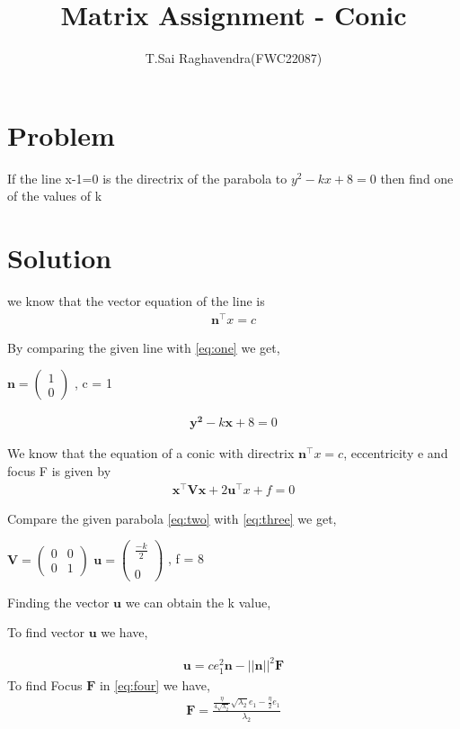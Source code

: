 \documentclass[journal,12pt,twocolumn]{IEEEtran}
\title{\mytitle}
\title{
Matrix Assignment - Conic
}
\author{T.Sai Raghavendra(FWC22087)}
\newcommand{\myvec}[1]{\ensuremath{\begin{pmatrix}#1\end{pmatrix}}}
\let\vec\mathbf
\begin{document}
\maketitle
\tableofcontents
\bigskip


\section{Problem}
If the line x-1=0 is the directrix of the parabola to $y^2-kx+8=0$ then find one of the values of k


\section{Solution}

we know that the vector equation of the line is 
\begin{align}
\label{eq:one}
\vec{n}^\top x = c
\end{align}

By comparing the given line with \eqref{eq:one} we get, 

\begin{center}
$\vec{n} = \myvec{1\\0}$ , c = 1 
\end{center}

\begin{align}
\label{eq:two}
\vec{y^2}-k\vec{x}+8=0 
\end{align}

We know that the equation of a conic with directrix $\vec{n}^\top x = c$, eccentricity e and focus F is given by 
\begin{align}
\label{eq:three}
\vec{x^\top Vx}+2\vec{u^\top}x+f = 0 
\end{align}


Compare the given parabola \eqref{eq:two} with \eqref{eq:three} we get,
\begin{center}
$\vec{V} = \myvec{0&0\\0&1}$ $\vec{u} = \myvec{\frac{-k}{2} \\ \\ 0}$ , f = 8
\end{center}

Finding the vector $\vec{u}$ we can obtain the k value, 

To find vector $\vec{u}$ we have,

\begin{align}
\label{eq:four}
\vec{u}=ce_1^2\vec{n}-||\vec{n}||^2\vec{F}
\end{align}
To find Focus $\vec{F}$ in \eqref{eq:four} we have,
\begin{align}
\label{eq:five}
\vec{F} = \frac{\frac{\eta}{4\sqrt{\lambda_2}}\sqrt{\lambda_2}e_1 - \frac{\eta}{2}e_1}{\lambda_2}
\end{align}
\end{document}
